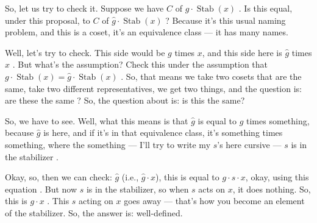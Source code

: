 \begin{proofWrapper}
\begin{speech}[00:26:42 - 00:28:28]
So, let us try to check it. Suppose we have $C$ of $g \cdot \operatorname{Stab}(x)$ . Is this equal, under this proposal, to $C$ of $\hat{g} \cdot \operatorname{Stab}(x)$ ? Because it's this usual naming problem, and this is a coset, it's an equivalence class --- it has many names.

Well, let's try to check. This side would be $g$ times $x$, and this side here is $\hat{g}$ times $x$ . But what's the assumption? Check this under the assumption that $g \cdot \operatorname{Stab}(x) = \hat{g} \cdot \operatorname{Stab}(x)$ . So, that means we take two cosets that are the same, take two different representatives, we get two things, and the question is: are these the same ? So, the question about  is: is this the same?

So, we have to see. Well, what this means is that $\hat{g}$ is equal to $g$ times something, because $\hat{g}$ is here, and if it's in that equivalence class, it's something times something, where the something --- I'll try to write my $s$'s here cursive --- $s$ is in the stabilizer .

Okay, so, then we can check: $\hat{g}$ (i.e., $\hat{g} \cdot x$), this is equal to $g \cdot s \cdot x$, okay, using this equation . But now $s$ is in the stabilizer, so when $s$ acts on $x$, it does nothing. So, this is $g \cdot x$ . This $s$ acting on $x$ goes away --- that's how you become an element of the stabilizer. So, the answer is: well-defined.
\end{speech}

\begin{content}


\end{content}
\end{proofWrapper}

